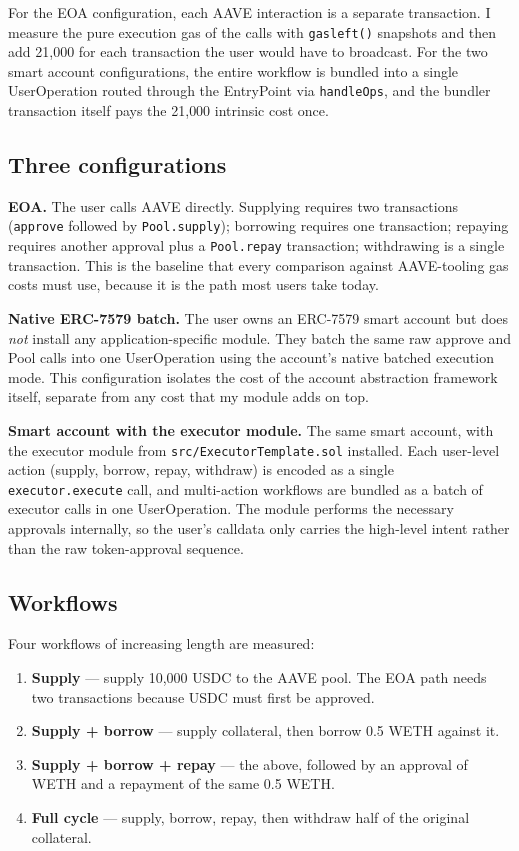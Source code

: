 For the EOA configuration, each AAVE interaction is a separate transaction. I
measure the pure execution gas of the calls with \texttt{gasleft()} snapshots
and then add 21{,}000 for each transaction the user would have to broadcast.
For the two smart account configurations, the entire workflow is bundled into a
single UserOperation routed through the EntryPoint via
\texttt{handleOps}, and the bundler transaction itself pays the 21{,}000
intrinsic cost once.

\subsection{Three configurations}

\textbf{EOA.} The user calls AAVE directly. Supplying requires two transactions
(\texttt{approve} followed by \texttt{Pool.supply}); borrowing requires one
transaction; repaying requires another approval plus a \texttt{Pool.repay}
transaction; withdrawing is a single transaction. This is the baseline that
every comparison against AAVE-tooling gas costs must use, because it is the
path most users take today.

\textbf{Native ERC-7579 batch.} The user owns an ERC-7579 smart account but
does \emph{not} install any application-specific module. They batch the same
raw approve and Pool calls into one UserOperation using the account's native
batched execution mode. This configuration isolates the cost of the account
abstraction framework itself, separate from any cost that my module adds on
top.

\textbf{Smart account with the executor module.} The same smart account,
with the executor module from \texttt{src/ExecutorTemplate.sol} installed.
Each user-level action (supply, borrow, repay, withdraw) is encoded as a
single \texttt{executor.execute} call, and multi-action workflows are bundled
as a batch of executor calls in one UserOperation. The module performs the
necessary approvals internally, so the user's calldata only carries the
high-level intent rather than the raw token-approval sequence.

\subsection{Workflows}

Four workflows of increasing length are measured:

\begin{enumerate}
    \item \textbf{Supply} — supply 10{,}000 USDC to the AAVE pool. The EOA
    path needs two transactions because USDC must first be approved.
    \item \textbf{Supply + borrow} — supply collateral, then borrow 0.5 WETH
    against it.
    \item \textbf{Supply + borrow + repay} — the above, followed by an
    approval of WETH and a repayment of the same 0.5 WETH.
    \item \textbf{Full cycle} — supply, borrow, repay, then withdraw half of
    the original collateral.
\end{enumerate}

